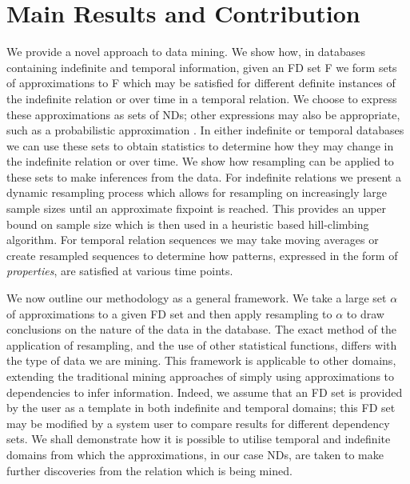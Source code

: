 \section{Main Results and Contribution}\label{sec:int_contrib}

We provide a novel approach to data mining. We show how, in databases
containing indefinite and temporal information, given an FD set F we
form sets of approximations to F which may be satisfied for
different definite instances of the indefinite relation or over time
in a temporal relation. We choose to express these approximations as
sets of NDs;
other expressions may also be appropriate, such as a probabilistic
approximation \cite{psm93}. In either indefinite or temporal databases
we can use these sets to obtain statistics to determine how they
may change in the indefinite relation or over time. We show
how resampling can be applied to these sets to make inferences from
the data. For indefinite relations we present a dynamic resampling
process which allows for resampling on increasingly large sample sizes
until an approximate fixpoint is reached. This provides an upper bound
on sample size which is then used in a heuristic based hill-climbing
algorithm. 
For temporal relation
sequences we may take moving averages or create resampled sequences to
determine how patterns, expressed in the form of {\em properties}, are
satisfied at various time points. 

\medskip

We now outline our methodology as a general framework. We
take a large set $\alpha$ of approximations to a given FD set and then
apply resampling to 
$\alpha$ to draw conclusions on the nature of the data in the
database. The exact method of the application of resampling, and the
use of other statistical functions, differs with the type of data we
are mining. This framework is applicable to other domains, extending
the traditional mining approaches of simply using approximations to
dependencies to infer information. Indeed, we assume that an FD set is
provided by the user as a template in both indefinite and temporal
domains; this FD set may be modified by a system user to compare
results for different dependency sets. We shall demonstrate how it is
possible to utilise temporal and indefinite domains from which the
approximations, in our 
case NDs, are taken to make further discoveries from the relation
which is being mined. 

